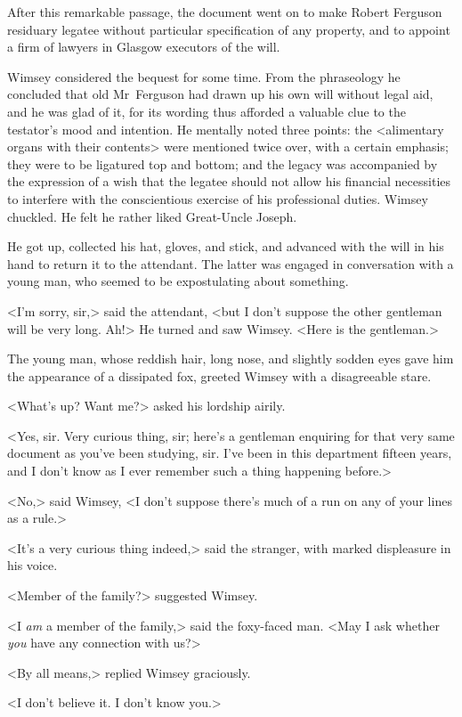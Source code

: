 After this remarkable passage, the document went on to make Robert Ferguson residuary legatee without particular specification of any property, and to appoint a firm of lawyers in Glasgow executors of the will.

Wimsey considered the bequest for some time. From the phraseology he concluded that old Mr~Ferguson had drawn up his own will without legal aid, and he was glad of it, for its wording thus afforded a valuable clue to the testator's mood and intention. He mentally noted three points: the <alimentary organs with their contents> were mentioned twice over, with a certain emphasis; they were to be ligatured top and bottom; and the legacy was accompanied by the expression of a wish that the legatee should not allow his financial necessities to interfere with the conscientious exercise of his professional duties. Wimsey chuckled. He felt he rather liked Great-Uncle Joseph.

He got up, collected his hat, gloves, and stick, and advanced with the will in his hand to return it to the attendant. The latter was engaged in conversation with a young man, who seemed to be expostulating about something.

<I'm sorry, sir,> said the attendant, <but I don't suppose the other gentleman will be very long. Ah!> He turned and saw Wimsey. <Here is the gentleman.>

The young man, whose reddish hair, long nose, and slightly sodden eyes gave him the appearance of a dissipated fox, greeted Wimsey with a disagreeable stare.

<What's up? Want me?> asked his lordship airily.

<Yes, sir. Very curious thing, sir; here's a gentleman enquiring for that very same document as you've been studying, sir. I've been in this department fifteen years, and I don't know as I ever remember such a thing happening before.>

<No,> said Wimsey, <I don't suppose there's much of a run on any of your lines as a rule.>

<It's a very curious thing indeed,> said the stranger, with marked displeasure in his voice.

<Member of the family?> suggested Wimsey.

<I \emph{am} a member of the family,> said the foxy-faced man. <May I ask whether \emph{you} have any connection with us?>

<By all means,> replied Wimsey graciously.

<I don't believe it. I don't know you.>

